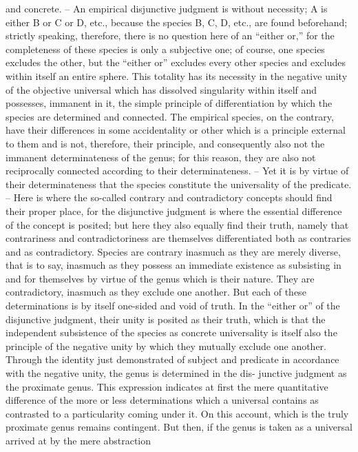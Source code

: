 and concrete. – An empirical disjunctive judgment is without necessity;
A is either B or C or D, etc., because the species B, C, D, etc., are
found beforehand; strictly speaking, therefore, there is no question here of
an “either or,” for the completeness of these species is only a subjective
one; of course, one species excludes the other, but the “either or” excludes
every other species and excludes within itself an entire sphere. This totality
has its necessity in the negative unity of the objective universal which
has dissolved singularity within itself and possesses, immanent in it, the
simple principle of differentiation by which the species are determined and
connected. The empirical species, on the contrary, have their differences
in some accidentality or other which is a principle external to them and
is not, therefore, their principle, and consequently also not the immanent
determinateness of the genus; for this reason, they are also not reciprocally
connected according to their determinateness. – Yet it is by virtue of
their determinateness that the species constitute the universality of the
predicate. – Here is where the so-called contrary and contradictory concepts
should find their proper place, for the disjunctive judgment is where the
essential difference of the concept is posited; but here they also equally find
their truth, namely that contrariness and contradictoriness are themselves
differentiated both as contraries and as contradictory. Species are contrary
inasmuch as they are merely diverse, that is to say, inasmuch as they possess
an immediate existence as subsisting in and for themselves by virtue of
the genus which is their nature. They are contradictory, inasmuch as they
exclude one another. But each of these determinations is by itself one-sided
and void of truth. In the “either or” of the disjunctive judgment, their
unity is posited as their truth, which is that the independent subsistence of
the species as concrete universality is itself also the principle of the negative
unity by which they mutually exclude one another.
Through the identity just demonstrated of subject and predicate in
accordance with the negative unity, the genus is determined in the dis-
junctive judgment as the proximate genus. This expression indicates at first
the mere quantitative difference of the more or less determinations which
a universal contains as contrasted to a particularity coming under it. On
this account, which is the truly proximate genus remains contingent. But
then, if the genus is taken as a universal arrived at by the mere abstraction
